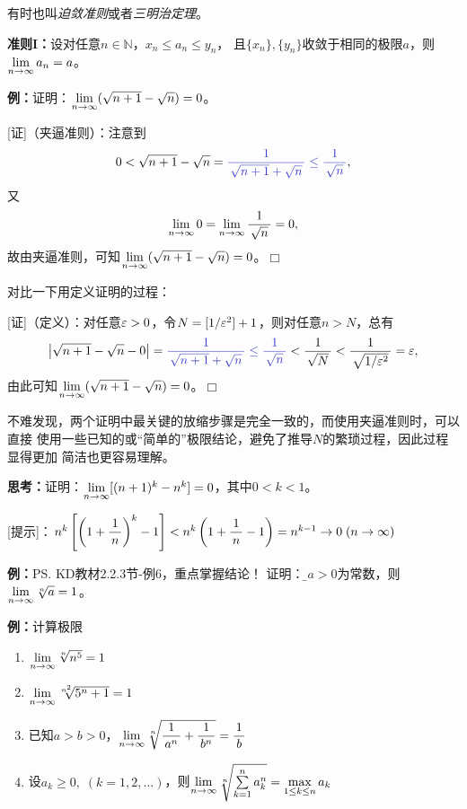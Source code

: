 有时也叫{\it 迫敛准则}或者{\it 三明治定理}。

{\bf 准则I：}设对任意$n\in\mathbb{N}$，$x_n\le a_n\le y_n$，
且$\{x_n\},\{y_n\}$收敛于相同的极限$a$，则$\lim\limits_{n\to\infty} a_n=a$。

\begin{center}
\end{center}

{\bf 例：}证明：$\lim\limits_{n\to\infty} (\sqrt{n+1}-\sqrt{n})=0$。

[证]（夹逼准则）：注意到
$$0<\sqrt{n+1}-\sqrt{n}={\b\df1{\sqrt{n+1}+\sqrt{n}}
\leq\df 1{\sqrt{n}}},$$
又
$$\lim\limits_{n\to\infty} 0=\lim\limits_{n\to\infty}\displaystyle\frac{\,{1}\,}{\,{\sqrt{n}}\,}=0,$$
故由夹逼准则，可知$\lim\limits_{n\to\infty} (\sqrt{n+1}-\sqrt{n})=0$。\hfill $\Box$

对比一下用定义证明的过程：

[证]（定义）：对任意$\varepsilon>0$，令$N=[1/\varepsilon^2]+1$，则对任意$n>N$，总有
$$\left|\sqrt{n+1}-\sqrt{n}-0\right|
={\b\df1{\sqrt{n+1}+\sqrt{n}}\leq\df 1{\sqrt{n}}}
<\df 1{\sqrt{N}}<\df 1{\sqrt{1/\e^2}}=\e,$$
由此可知$\lim\limits_{n\to\infty} (\sqrt{n+1}-\sqrt{n})=0$。\hfill $\Box$

不难发现，两个证明中最关键的放缩步骤是完全一致的，而使用夹逼准则时，可以直接
使用一些已知的或“简单的”极限结论，避免了推导$N$的繁琐过程，因此过程显得更加
简洁也更容易理解。

{\bf 思考：}证明：$\lim\limits_{n\to\infty} [(n+1)^k-{n}^k]=0$，其中$0<k<1$。

[提示]：$n^k\left[\left(1+\displaystyle\frac{\,{1}\,}{\,{n}\,}\right)^k-1\right]
<n^k\left(1+\displaystyle\frac{\,{1}\,}{\,{n}\,}-1\right)=n^{k-1}\to 0\;(n\to\infty)$

{\bf 例：}\ps{KD教材2.2.3节-例6，重点掌握结论！}
证明：{\b 若$a>0$为常数，则$\lim\limits_{n\to\infty} \sqrt[n]{a}=1$}。

{\bf 例：}计算极限
\begin{enumerate}[(1)]
  \setlength{\itemindent}{1cm}
  \item $\lim\limits_{n\to\infty}\sqrt[n]{n^5}=1$
  \item $\lim\limits_{n\to\infty}\sqrt[n^2]{5^n+1}=1$
  \item 已知$a>b>0$，$\lim\limits_{n\to\infty}\sqrt[n]{\displaystyle\frac{\,{1}\,}{\,{a^n}\,}+\displaystyle\frac{\,{1}\,}{\,{b^n}\,}}=\displaystyle\frac{\,{1}\,}{\,{b}\,}$
  \item 设$a_k\geq0,\;(k=1,2,\ldots)$，则$\lim\limits_{n\to\infty}\sqrt[n]
  {\sum\limits_{k=1}^na_k^n}=\max\limits_{1\leq k\leq n}a_k$
\end{enumerate}
 
